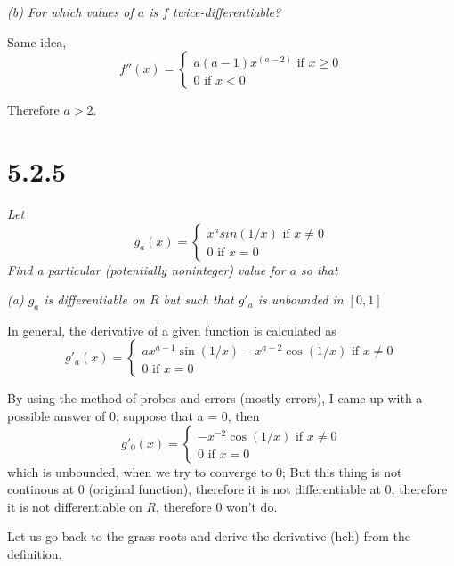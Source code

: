 \documentclass[11pt,oneside,titlepage]{book}
\begin{document}
\textit{(b) For which values of $a$ is $f$ twice-differentiable?}

Same idea,
\begin{equation}
  f''(x) =
  \begin{cases}
    a(a - 1)x^(a - 2) \text{ if } x \geq 0 \\
    0 \text{ if } x < 0
  \end{cases}
\end{equation}

Therefore $a > 2$.

\section*{5.2.5}
\textit{Let }
\begin{equation}
  g_a(x) =
  \begin{cases}
    x^a sin(1/x) \text{ if } x \neq 0 \\
    0 \text{ if } x = 0
  \end{cases}
\end{equation}
\textit{Find a particular (potentially noninteger) value for $a$ so that}

\textit{(a) $g_a$ is differentiable on $R$ but such that $g'_a$ is unbounded
  in $[0, 1]$}

In general, the derivative of a given function is calculated as
\begin{equation}
  g'_a(x) =
  \begin{cases}
    ax^{a - 1} \sin(1/x) - x^{a - 2}\cos(1/x) \text{ if } x \neq 0 \\
    0 \text{ if } x = 0
  \end{cases}
\end{equation}

By using the method of probes and errors (mostly errors), I came up with
a possible answer of 0; suppose that a = 0, then
\begin{equation}
  g'_0(x) =
  \begin{cases}
    - x^{-2}\cos(1/x) \text{ if } x \neq 0 \\
    0 \text{ if } x = 0
  \end{cases}
\end{equation}
which is unbounded, when we try to converge to 0; But this thing is not
continous at 0 (original function), therefore it is not differentiable at
0, therefore it is not differentiable on $R$,  therefore $0$ won't do.

Let us go back to the grass roots and derive the derivative (heh) from the
definition.
\end{document}
